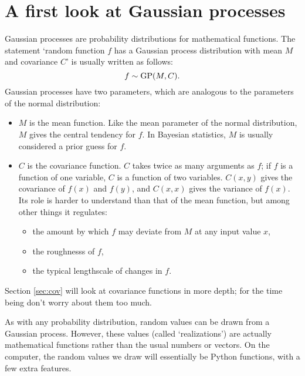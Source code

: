 \section{A first look at Gaussian processes}\label{sec:firstlook}

Gaussian processes are probability distributions for mathematical functions. The statement `random function $f$ has a Gaussian process distribution with mean $M$ and covariance $C$' is usually written as follows:
\begin{equation}
    f\sim\textup{GP}(M,C).
\end{equation}
Gaussian processes have two parameters, which are analogous to the parameters of the normal distribution:
\begin{itemize}
    \item $M$ is the mean function. Like the mean parameter of the normal distribution, $M$ gives the central tendency for $f$. In Bayesian statistics, $M$ is usually considered a prior guess for $f$.
    \item $C$ is the covariance function. $C$ takes twice as many arguments as $f$; if $f$ is a function of one variable, $C$ is a function of two variables. $C(x,y)$ gives the covariance of $f(x)$ and $f(y)$, and $C(x,x)$ gives the variance of $f(x)$. Its role is harder to understand than that of the mean function, but among other things it regulates:
    \begin{itemize}
        \item the amount by which $f$ may deviate from $M$ at any input value $x$,
        \item the roughnesss of $f$,
        \item the typical lengthscale of changes in $f$.
    \end{itemize}
\end{itemize}
Section \ref{sec:cov} will look at covariance functions in more depth; for the time being don't worry about them too much.

As with any probability distribution, random values can be drawn from a Gaussian process. However, these values (called `realizations') are actually mathematical functions rather than the usual numbers or vectors. On the computer, the random values we draw will essentially be Python functions, with a few extra features.

